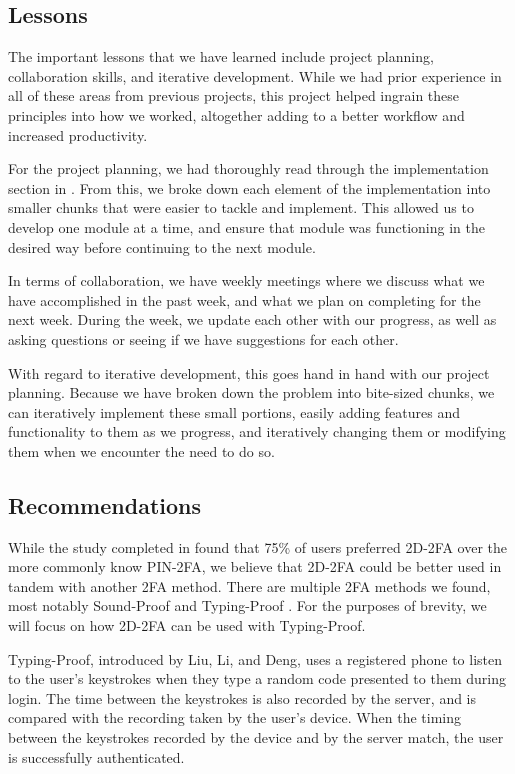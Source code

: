 \documentclass[11pt]{article}
\begin{document}
\subsection{Lessons}

The important lessons that we have learned include project planning,
collaboration skills, and iterative development. While we had prior
experience in all of these areas from previous projects, this project
helped ingrain these principles into how we worked, altogether adding to
a better workflow and increased productivity. 

For the project planning, we had thoroughly read through the
implementation section in \cite{shirvanian2d2fa}. From this, we 
broke down each element of the implementation into smaller chunks that
were easier to tackle and implement. This allowed us to develop one
module at a time, and ensure that module was functioning in the desired
way before continuing to the next module. 

In terms of collaboration, we have weekly meetings where we discuss what
we have accomplished in the past week, and what we plan on completing
for the next week. During the week, we update each other with our
progress, as well as asking questions or seeing if we have suggestions
for each other. 

With regard to iterative development, this goes hand in hand with our
project planning. Because we have broken down the problem into
bite-sized chunks, we can iteratively implement these small portions,
easily adding features and functionality to them as we progress, and
iteratively changing them or modifying them when we encounter the need
to do so.

\subsection{Recommendations}

While the study completed in \cite{shirvanian2d2fa} found that 75\% of
users preferred 2D-2FA over the more commonly know PIN-2FA, we believe
that 2D-2FA could be better used in tandem with another 2FA method.
There are multiple 2FA methods we found, most notably Sound-Proof
\cite{soundProof} and Typing-Proof \cite{liuTypingProof}. For the
purposes of brevity, we will focus on how 2D-2FA can be used with
Typing-Proof. 

Typing-Proof, introduced by Liu, Li, and Deng, uses a registered phone
to listen to the user's keystrokes when they type a random code
presented to them during login. The time between the keystrokes is also
recorded by the server, and is compared with the recording taken by the
user's device. When the timing between the keystrokes recorded by the
device and by the server match, the user is successfully authenticated. 
\end{document}
